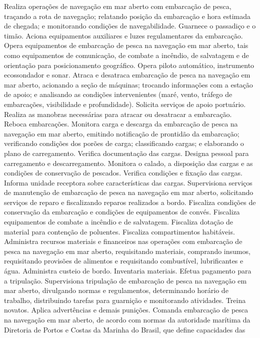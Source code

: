 \documentclass[
]{article}
\begin{document}
Realiza operações de navegação em mar aberto com embarcação de pesca,
traçando a rota de navegação; relatando posição da embarcação e hora
estimada de chegada; e monitorando condições de navegabilidade. Guarnece
o passadiço e o timão. Aciona equipamentos auxiliares e luzes
regulamentares da embarcação. Opera equipamentos de embarcação de pesca
na navegação em mar aberto, tais como equipamentos de comunicação, de
combate a incêndio, de salvatagem e de orientação para posicionamento
geográfico. Opera piloto automático, instrumento ecossondador e sonar.
Atraca e desatraca embarcação de pesca na navegação em mar aberto,
acionando a seção de máquinas; trocando informações com a estação de
apoio; e analisando as condições intervenientes (maré, vento, tráfego de
embarcações, visibilidade e profundidade). Solicita serviços de apoio
portuário. Realiza as manobras necessárias para atracar ou desatracar a
embarcação. Reboca embarcações. Monitora carga e descarga da embarcação
de pesca na navegação em mar aberto, emitindo notificação de prontidão
da embarcação; verificando condições dos porões de carga; classificando
cargas; e elaborando o plano de carregamento. Verifica documentação das
cargas. Designa pessoal para carregamento e descarregamento. Monitora o
calado, a disposição das cargas e as condições de conservação de
pescados. Verifica condições e fixação das cargas. Informa unidade
receptora sobre características das cargas. Supervisiona serviços de
manutenção de embarcação de pesca na navegação em mar aberto,
solicitando serviços de reparo e fiscalizando reparos realizados a
bordo. Fiscaliza condições de conservação da embarcação e condições de
equipamentos de convés. Fiscaliza equipamentos de combate a incêndio e
de salvatagem. Fiscaliza dotação de material para contenção de
poluentes. Fiscaliza compartimentos habitáveis. Administra recursos
materiais e financeiros nas operações com embarcação de pesca na
navegação em mar aberto, requisitando materiais, comprando insumos,
requisitando provisões de alimentos e requisitando combustível,
lubrificantes e água. Administra custeio de bordo. Inventaria materiais.
Efetua pagamento para a tripulação. Supervisiona tripulação de
embarcação de pesca na navegação em mar aberto, divulgando normas e
regulamentos, determinando horário de trabalho, distribuindo tarefas
para guarnição e monitorando atividades. Treina novatos. Aplica
advertências e demais punições. Comanda embarcação de pesca na navegação
em mar aberto, de acordo com normas da autoridade marítima da Diretoria
de Portos e Costas da Marinha do Brasil, que define capacidades das
\end{document}
